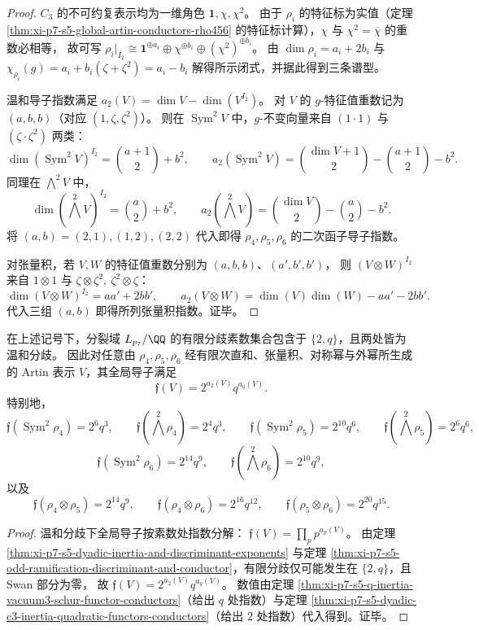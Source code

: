 \begin{proof}
\(C_3\) 的不可约复表示均为一维角色 \(\mathbf 1,\chi,\chi^2\)。
由于 \(\rho_i\) 的特征标为实值（定理 \ref{thm:xi-p7-s5-global-artin-conductors-rho456} 的特征标计算），\(\chi\) 与 \(\chi^2=\overline{\chi}\) 的重数必相等，
故可写
\(
\rho_i|_{I_2}\cong \mathbf 1^{\oplus a_i}\oplus \chi^{\oplus b_i}\oplus(\chi^2)^{\oplus b_i}
\)。
由
\(
\dim\rho_i=a_i+2b_i
\)
与
\(
\chi_{\rho_i}(g)=a_i+b_i(\zeta+\zeta^2)=a_i-b_i
\)
解得所示闭式，并据此得到三条谱型。
\par
温和导子指数满足 \(a_2(V)=\dim V-\dim(V^{I_2})\)。
对 \(V\) 的 \(g\)-特征值重数记为 \((a,b,b)\)（对应 \((1,\zeta,\zeta^2)\)）。
则在 \(\operatorname{Sym}^2V\) 中，\(g\)-不变向量来自 \((1\cdot 1)\) 与 \((\zeta\cdot \zeta^2)\) 两类：
\[
\dim(\operatorname{Sym}^2V)^{I_2}=\binom{a+1}{2}+b^2,
\qquad
a_2(\operatorname{Sym}^2V)=\binom{\dim V+1}{2}-\binom{a+1}{2}-b^2.
\]
同理在 \(\bigwedge^2V\) 中，
\[
\dim(\bigwedge^2V)^{I_2}=\binom{a}{2}+b^2,
\qquad
a_2(\bigwedge^2V)=\binom{\dim V}{2}-\binom{a}{2}-b^2.
\]
将 \((a,b)=(2,1),(1,2),(2,2)\) 代入即得 \(\rho_4,\rho_5,\rho_6\) 的二次函子导子指数。
\par
对张量积，若 \(V,W\) 的特征值重数分别为 \((a,b,b)\)、\((a',b',b')\)，
则
\(
(V\otimes W)^{I_2}
\)
来自 \(1\otimes 1\) 与 \(\zeta\otimes \zeta^2,\ \zeta^2\otimes \zeta\)：
\[
\dim(V\otimes W)^{I_2}=aa'+2bb',
\qquad
a_2(V\otimes W)=\dim(V)\dim(W)-aa'-2bb'.
\]
代入三组 \((a,b)\) 即得所列张量积指数。证毕。
\end{proof}

\begin{corollary}\label{cor:xi-p7-s5-global-conductors-schur-quadratic-tensor}
在上述记号下，分裂域 \(L_{p_7}/\QQ\) 的有限分歧素数集合包含于 \(\{2,q\}\)，且两处皆为温和分歧。
因此对任意由 \(\rho_4,\rho_5,\rho_6\) 经有限次直和、张量积、对称幂与外幂所生成的 Artin 表示 \(V\)，其全局导子满足
\[
\mathfrak f(V)=2^{a_2(V)}q^{a_q(V)}.
\]
特别地，
\[
\mathfrak f(\operatorname{Sym}^2\rho_4)=2^{6}q^{3},\qquad
\mathfrak f(\bigwedge^2\rho_4)=2^{4}q^{3},\qquad
\mathfrak f(\operatorname{Sym}^2\rho_5)=2^{10}q^{6},\qquad
\mathfrak f(\bigwedge^2\rho_5)=2^{6}q^{6},
\]
\[
\mathfrak f(\operatorname{Sym}^2\rho_6)=2^{14}q^{9},\qquad
\mathfrak f(\bigwedge^2\rho_6)=2^{10}q^{9},
\]
以及
\[
\mathfrak f(\rho_4\otimes\rho_5)=2^{14}q^{9},\qquad
\mathfrak f(\rho_4\otimes\rho_6)=2^{16}q^{12},\qquad
\mathfrak f(\rho_5\otimes\rho_6)=2^{20}q^{15}.
\]
\end{corollary}

\begin{proof}
温和分歧下全局导子按素数处指数分解：
\(
\mathfrak f(V)=\prod_p p^{a_p(V)}
\)。
由定理 \ref{thm:xi-p7-s5-dyadic-inertia-and-discriminant-exponents} 与定理 \ref{thm:xi-p7-s5-odd-ramification-discriminant-and-conductor}，有限分歧仅可能发生在 \(\{2,q\}\)，且 Swan 部分为零，
故 \(\mathfrak f(V)=2^{a_2(V)}q^{a_q(V)}\)。
数值由定理 \ref{thm:xi-p7-s5-q-inertia-vacuum3-schur-functor-conductors}（给出 \(q\) 处指数）与定理 \ref{thm:xi-p7-s5-dyadic-c3-inertia-quadratic-functors-conductors}（给出 \(2\) 处指数）代入得到。证毕。
\end{proof}

